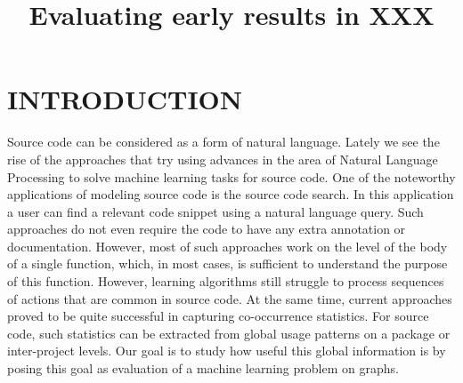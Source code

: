 \documentclass[a4paper,twoside]{article}
\begin{document}
\title{Evaluating early results in XXX}

\author{
}

\keywords{}

\abstract{
}

\onecolumn \maketitle \normalsize \setcounter{footnote}{0} \vfill

\section{\uppercase{Introduction}}
Source code can be considered as a form of natural language. Lately we see the rise of the approaches that try using advances in the area of Natural Language Processing to solve machine learning tasks for source code. One of the noteworthy applications of modeling source code is the source code search. In this application a user can find a relevant code snippet using a natural language query. Such approaches do not even require the code to have any extra annotation or documentation. However, most of such approaches work on the level of the body of a single function, which, in most cases, is sufficient to understand the purpose of this function. However, learning algorithms still struggle to process sequences of actions that are common in source code. At the same time, current approaches proved to be quite successful in capturing co-occurrence statistics. For source code, such statistics can be extracted from global usage patterns on a package or inter-project levels. Our goal is to study how useful this global information is by posing this goal as evaluation of a machine learning problem on graphs.
 
\end{document}
